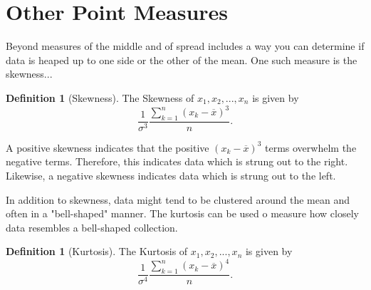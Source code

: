 \documentclass[10pt,]{book}
\theoremstyle{plain}
\theoremstyle{definition}
\newtheorem{definition}[theorem]{Definition}
\theoremstyle{definition}
\numberwithin{equation}{section}
\begin{document}
\section[Other Point Measures]{Other Point Measures}\label{section-10}
Beyond measures of the middle and of spread includes a way you can determine if data is heaped up to one side or the other of the mean. One such measure is the skewness...
%
\begin{definition}[Skewness]\label{definition-15}
The Skewness of \(x_1, x_2, ..., x_n\) is given by
\begin{equation*} \frac{1}{\sigma^3} \frac{\sum_{k=1}^n ( x_k-\overline{x} )^3}{n}.\end{equation*}
%
\end{definition}
\par

A positive skewness indicates that the positive \((x_k - \overline{x})^3\) terms overwhelm the negative terms. Therefore, this indicates data which is strung out to the right. Likewise, a negative skewness indicates data which is strung out to the left.
%
\par

In addition to skewness, data might tend to be clustered around the mean and often in a "bell-shaped" manner. The kurtosis can be used o measure how closely data resembles a bell-shaped collection.
%
\begin{definition}[Kurtosis]\label{definition-16}
The Kurtosis of \(x_1, x_2, ..., x_n\) is given by
\begin{equation*} \frac{1}{\sigma^4} \frac{\sum_{k=1}^n ( x_k-\overline{x} )^4}{n}.\end{equation*}
%
\end{definition}
\par
\end{document}
